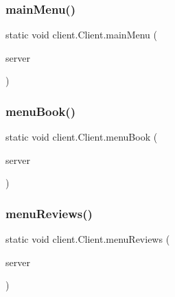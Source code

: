 \mbox{\label{classclient_1_1_client_abb4f93c11e43c61c21ac7f42a826964c}} 
\subsubsection{\texorpdfstring{main\+Menu()}{mainMenu()}}
{\footnotesize\ttfamily static void client.\+Client.\+main\+Menu (\begin{DoxyParamCaption}\item[{\hyperlink{interfaceserver_1_1remote_1_1_i_remote}{I\+Remote}}]{server }\end{DoxyParamCaption})\hspace{0.3cm}{\ttfamily [static]}}

\mbox{\label{classclient_1_1_client_aa8fa722000df2208c9a3f4ac7092ea5e}} 
\subsubsection{\texorpdfstring{menu\+Book()}{menuBook()}}
{\footnotesize\ttfamily static void client.\+Client.\+menu\+Book (\begin{DoxyParamCaption}\item[{\hyperlink{interfaceserver_1_1remote_1_1_i_remote}{I\+Remote}}]{server }\end{DoxyParamCaption})\hspace{0.3cm}{\ttfamily [static]}}

\mbox{\label{classclient_1_1_client_ab5381c77d6c103c49fe3a876e711c318}} 
\subsubsection{\texorpdfstring{menu\+Reviews()}{menuReviews()}}
{\footnotesize\ttfamily static void client.\+Client.\+menu\+Reviews (\begin{DoxyParamCaption}\item[{\hyperlink{interfaceserver_1_1remote_1_1_i_remote}{I\+Remote}}]{server }\end{DoxyParamCaption})\hspace{0.3cm}{\ttfamily [static]}}

